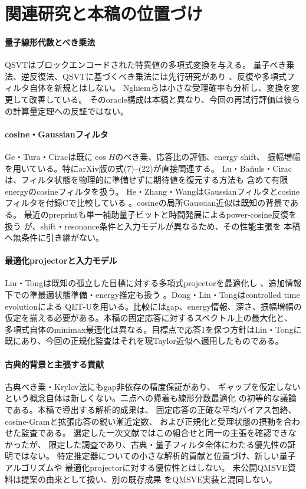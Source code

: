 \documentclass[11pt,a4paper]{article}
\begin{document}
{\section{関連研究と本稿の位置づけ}
\paragraph{量子線形代数とべき乗法}
QSVTはブロックエンコードされた特異値の多項式変換を与える\cite{Gilyen}。
量子べき乗法、逆反復法、QSVTに基づくべき乗法には先行研究があり
\cite{SekiYunoki,Kyriienko,Nghiem}、反復や多項式フィルタ自体を新規とはしない。
Nghiemらは小さな受理確率も分析し、変換を変更して改善している。
そのoracle構成は本稿と異なり、今回の再試行評価は彼らの計算量定理への反証ではない。

\paragraph{cosine・Gaussianフィルタ}
Ge・Tura・Ciracは既に$\cos H$のべき乗、応答比の評価、energy shift、
振幅増幅を用いている\cite{GeTuraCirac}。特にarXiv版の式(7)--(22)が直接関連する。
Lu・Ba\~nuls・Ciracは、フィルタ状態を物理的に準備せずに期待値を復元する方法も
含めて有限energyのcosineフィルタを扱う\cite{LuBanulsCirac}。
He・Zhang・WangはGaussianフィルタとcosineフィルタを付録Cで比較している
\cite{HeZhangWang}。cosineの局所Gaussian近似は既知の背景である。
最近のpreprintも単一補助量子ビットと時間発展によるpower-cosine反復を扱う
\cite{Jo}が、shift・resonance条件と入力モデルが異なるため、その性能主張を
本稿へ無条件に引き継がない。

\paragraph{最適化projectorと入力モデル}
Lin・Tongは既知の孤立した目標に対する多項式projectorを最適化し
\cite{LinTongFilter}、追加情報下での準最適状態準備・energy推定も扱う
\cite{LinTongGround}。Dong・Lin・Tongはcontrolled time evolutionによる
QET-Uを用いる\cite{DongLinTong}。比較にはgap、energy情報、深さ、振幅増幅の
仮定を揃える必要がある。本稿の固定応答に対するスペクトル上の最大化と、
多項式自体のminimax最適化は異なる。目標点で応答1を保つ方針はLin・Tongに
既にあり、今回の正規化監査はそれを現Taylor近似へ適用したものである。

\paragraph{古典的背景と主張する貢献}
古典べき乗・Krylov法にもgap非依存の精度保証があり\cite{MuscoMusco}、
ギャップを仮定しないという概念自体は新しくない。二点への帰着も線形分数最適化
\cite{CharnesCooper}の初等的な議論である。本稿で導出する解析的成果は、
固定応答の正確な平均バイアス包絡、cosine-Gramと拡張応答の鋭い漸近定数、
および正規化と受理状態の摂動を合わせた監査である。
選定した一次文献ではこの組合せと同一の主張を確認できなかったが、
限定した調査であり、古典・量子フィルタ全体にわたる優先性の証明ではない。
特定推定器についての小さな解析的貢献と位置づけ、新しい量子アルゴリズムや
最適化projectorに対する優位性とはしない。
未公開QMSVE資料は提案の由来として扱い\cite{QMSVE}、別の既存成果
\cite{QCG2023,QCG2024}をQMSVE実装と混同しない。
}
\end{document}
